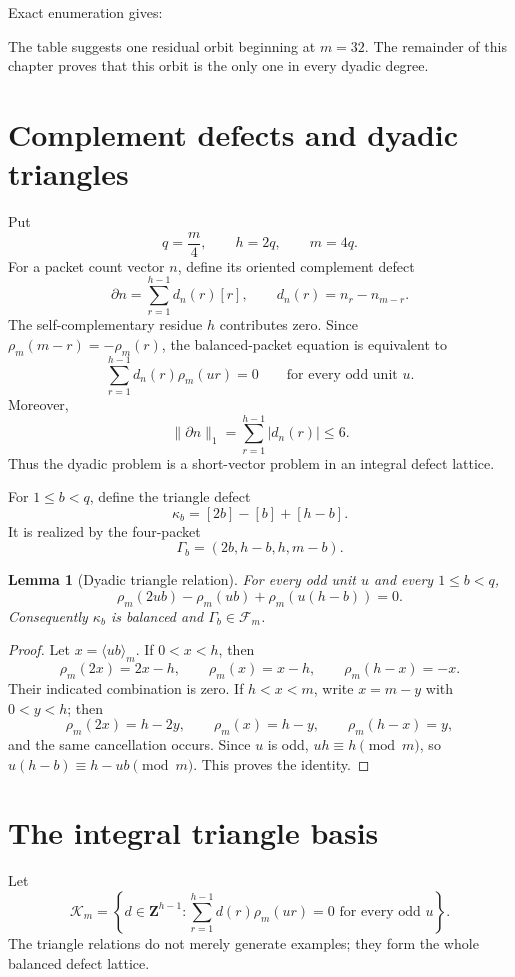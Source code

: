 \documentclass[11pt,oneside]{book}
\newtheorem{lemma}[theorem]{Lemma}
\theoremstyle{definition}
\theoremstyle{remark}
\begin{document}
Exact enumeration gives:
\begin{center}

\end{center}
The table suggests one residual orbit beginning at \(m=32\). The remainder of this chapter proves that this orbit is the only one in every dyadic degree.

\section{Complement defects and dyadic triangles}
Put
\[
q=\frac m4,
\qquad h=2q,
\qquad m=4q.
\]
For a packet count vector \(n\), define its oriented complement defect
\[
\partial n=\sum_{r=1}^{h-1}d_n(r)[r],
\qquad
d_n(r)=n_r-n_{m-r}.
\]
The self-complementary residue \(h\) contributes zero. Since
\(\rho_m(m-r)=-\rho_m(r)\), the balanced-packet equation is equivalent to
\[
\sum_{r=1}^{h-1}d_n(r)\rho_m(ur)=0
\qquad\text{for every odd unit }u.
\]
Moreover,
\[
\|\partial n\|_1=\sum_{r=1}^{h-1}|d_n(r)|\le 6.
\]
Thus the dyadic problem is a short-vector problem in an integral defect lattice.

For \(1\le b<q\), define the triangle defect
\[
\kappa_b=[2b]-[b]+[h-b].
\]
It is realized by the four-packet
\[
\Gamma_b=(2b,h-b,h,m-b).
\]

\begin{lemma}[Dyadic triangle relation]
For every odd unit \(u\) and every \(1\le b<q\),
\[
\rho_m(2ub)-\rho_m(ub)+\rho_m(u(h-b))=0.
\]
Consequently \(\kappa_b\) is balanced and \(\Gamma_b\in\mathcal F_m\).
\end{lemma}
\begin{proof}
Let \(x=\langle ub\rangle_m\). If \(0<x<h\), then
\[
\rho_m(2x)=2x-h,
\qquad
\rho_m(x)=x-h,
\qquad
\rho_m(h-x)=-x.
\]
Their indicated combination is zero. If \(h<x<m\), write \(x=m-y\) with \(0<y<h\); then
\[
\rho_m(2x)=h-2y,
\qquad
\rho_m(x)=h-y,
\qquad
\rho_m(h-x)=y,
\]
and the same cancellation occurs. Since \(u\) is odd, \(uh\equiv h\pmod m\), so \(u(h-b)\equiv h-ub\pmod m\). This proves the identity.
\end{proof}

\section{The integral triangle basis}
Let
\[
\mathcal K_m=
\left\{
 d\in\mathbf Z^{h-1}:
 \sum_{r=1}^{h-1}d(r)\rho_m(ur)=0
 \text{ for every odd }u
\right\}.
\]
The triangle relations do not merely generate examples; they form the whole balanced defect lattice.
\end{document}
